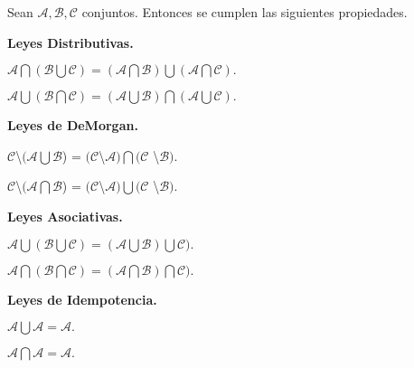 \begin{proposition}
	Sean $\mathcal{A,B,C}$ conjuntos. Entonces se cumplen las siguientes propiedades.
	\begin{iteritem}
		\begin{centering}
	\item \textbf{Leyes Distributivas.}
		\begin{iteritem}			
			
		\item $\mathcal{A} \bigcap (\mathcal{B} \bigcup \mathcal{C}) = (\mathcal{A} \bigcap \mathcal{B}) \bigcup (\mathcal{A} \bigcap \mathcal{C}).$
		\item $\mathcal{A} \bigcup (\mathcal{B} \bigcap \mathcal{C}) = (\mathcal{A} \bigcup \mathcal{B}) \bigcap (\mathcal{A} \bigcup \mathcal{C}).$
		\end{iteritem}

	\item \textbf{Leyes de DeMorgan.}
		\begin{iteritem}	
		\item $\mathcal{C}$\textbackslash$(\mathcal{A} \bigcup \mathcal{B}$) = $(\mathcal{C}$\textbackslash$\mathcal{A}) \bigcap (\mathcal{C}$ \textbackslash $\mathcal{B}).$	
		\item $\mathcal{C}$\textbackslash$(\mathcal{A} \bigcap \mathcal{B}$) = $(\mathcal{C}$\textbackslash$\mathcal{A}) \bigcup (\mathcal{C}$ \textbackslash $\mathcal{B}).$	
		\end{iteritem}

	\item \textbf{Leyes Asociativas.}
		\begin{iteritem}
		\item $\mathcal{A} \bigcup (\mathcal{B} \bigcup \mathcal{C}) = (\mathcal{A} \bigcup \mathcal{B}) \bigcup \mathcal{C}).$
		\item $\mathcal{A} \bigcap (\mathcal{B} \bigcap \mathcal{C}) = (\mathcal{A} \bigcap \mathcal{B}) \bigcap \mathcal{C}).$
		\end{iteritem}

	\item \textbf{Leyes de Idempotencia.}
		\begin{iteritem}
		\item $\mathcal{A} \bigcup \mathcal{A} = \mathcal{A}.$
		\item $\mathcal{A} \bigcap \mathcal{A} = \mathcal{A}.$
		\end{iteritem}
		
		\end{centering}
	\end{iteritem}
\end{proposition}
